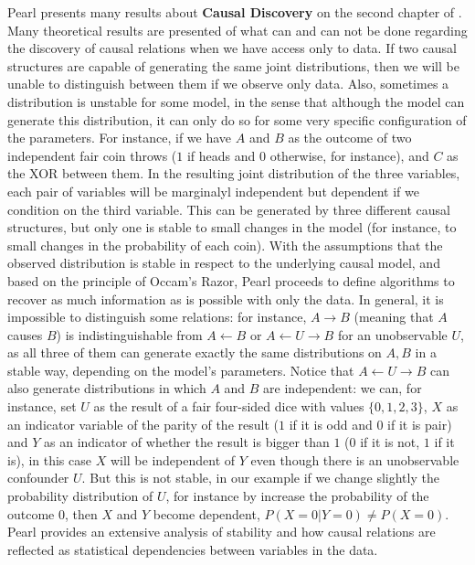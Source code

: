 Pearl presents many results about \textbf{Causal Discovery} on the second chapter of \cite{Causality}. Many theoretical results are presented of what can and can not be done regarding the discovery of causal relations when we have access only to data. If two causal structures are capable of generating the same joint distributions, then we will be unable to distinguish between them if we observe only data. Also, sometimes a distribution is unstable for some model, in the sense that although the model can generate this distribution, it can only do so for some very specific configuration of the parameters. For instance, if we have $A$ and $B$ as the outcome of two independent fair coin throws ($1$ if heads and $0$ otherwise, for instance), and $C$ as the XOR between them. In the resulting joint distribution of the three variables, each pair of variables will be marginalyl independent but dependent if we condition on the third variable. This can be generated by three different causal structures, but only one is stable to small changes in the model (for instance, to small changes in the probability of each coin). With the assumptions that the observed distribution is stable in respect to the underlying causal model, and based on the principle of Occam's Razor, Pearl proceeds to define algorithms to recover as much information as is possible with only the data. In general, it is impossible to distinguish some relations: for instance, $A \rightarrow B$ (meaning that $A$ causes $B$) is indistinguishable from $A \leftarrow B$ or $A \leftarrow U \rightarrow B$ for an unobservable $U$, as all three of them can generate exactly the same distributions on $A,B$ in a stable way, depending on the model's parameters. Notice that $A \leftarrow U \rightarrow B$ can also generate distributions in which $A$ and $B$ are independent: we can, for instance, set $U$ as the result of a fair four-sided dice with values $\{0,1,2,3\}$, $X$ as an indicator variable of the parity of the result ($1$ if it is odd and $0$ if it is pair) and $Y$ as an indicator of whether the result is bigger than $1$ ($0$ if it is not, $1$ if it is), in this case $X$ will be independent of $Y$ even though there is an unobservable confounder $U$. But this is not stable, in our example if we change slightly the probability distribution of $U$, for instance by increase the probability of the outcome $0$, then $X$ and $Y$ become dependent, $P(X=0|Y=0) \neq P(X=0)$. Pearl provides an extensive analysis of stability and how causal relations are reflected as statistical dependencies between variables in the data.

